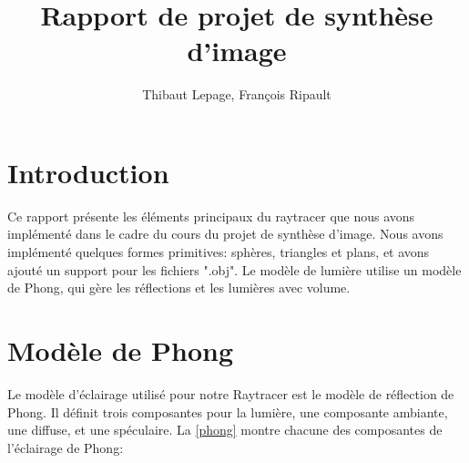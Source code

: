 \documentclass{article}
\title{Rapport de projet de synthèse d'image}
\author{Thibaut Lepage, François Ripault}
\begin{document}
\maketitle

\section*{Introduction}

Ce rapport présente les éléments principaux du raytracer que nous avons
implémenté dans le cadre du cours du projet de synthèse d'image. Nous avons
implémenté quelques formes primitives: sphères, triangles et plans, et avons
ajouté un support pour les fichiers ".obj". Le modèle de lumière utilise un
modèle de Phong, qui gère les réflections et les lumières avec volume.

\section{Modèle de Phong}

Le modèle d'éclairage utilisé pour notre Raytracer est le modèle de réflection
de Phong. Il définit trois composantes pour la lumière, une composante
ambiante, une diffuse, et une spéculaire.
La \cref{phong} montre chacune des composantes de l'éclairage de Phong:
\end{document}
